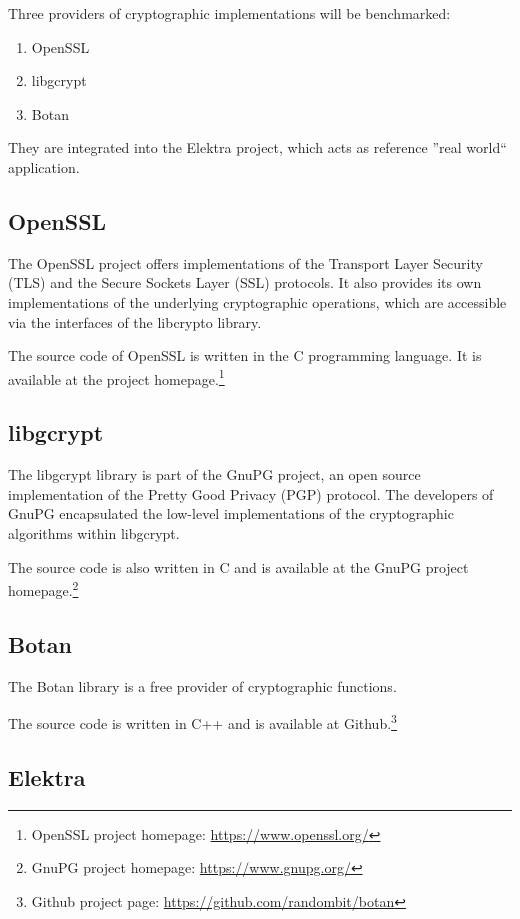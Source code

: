 Three providers of cryptographic implementations will be benchmarked:

\begin{enumerate}
\item OpenSSL
\item libgcrypt
\item Botan
\end{enumerate}

They are integrated into the Elektra project, which acts as reference ''real world`` application.

	\subsection{OpenSSL}

The OpenSSL project offers implementations of the Transport Layer Security (TLS) and the Secure Sockets Layer (SSL) protocols.
It also provides its own implementations of the underlying cryptographic operations, which are accessible via the interfaces of the libcrypto library.

The source code of OpenSSL is written in the C programming language.
It is available at the project homepage.\footnote{OpenSSL project homepage: \url{https://www.openssl.org/}}

	\subsection{libgcrypt}

The libgcrypt library is part of the GnuPG project, an open source implementation of the Pretty Good Privacy (PGP) protocol.
The developers of GnuPG encapsulated the low-level implementations of the cryptographic algorithms within libgcrypt.

The source code is also written in C and is available at the GnuPG project homepage.\footnote{GnuPG project homepage: \url{https://www.gnupg.org/}}

	\subsection{Botan}

The Botan library is a free provider of cryptographic functions.

The source code is written in C++ and is available at Github.\footnote{Github project page: \url{https://github.com/randombit/botan}}

	\subsection{Elektra}

